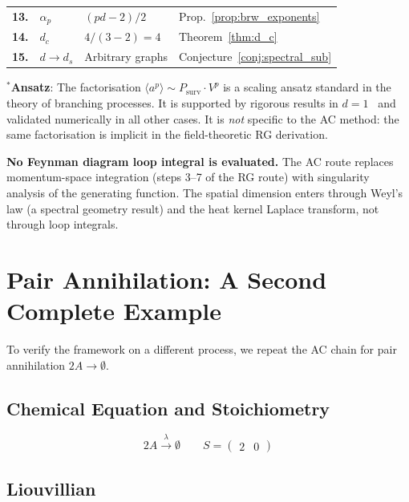 \documentclass[11pt,a4paper]{article}
\theoremstyle{definition}
\newcommand{\Psurv}{P_{\mathrm{surv}}}
\begin{document}
\begin{tcolorbox}[
  colback=blue!3, colframe=deepblue, arc=4pt,
  title={\textbf{Complete AC Route: Chemical Equation $\to$ Critical Exponents}},
  fonttitle=\bfseries\color{white},
  coltitle=white,
  breakable
]
\begin{tabular}{@{}rlp{5.5cm}l@{}}
\textbf{13.} & $\alpha_p$ &
$\boxed{(pd - 2)/2}$
& Prop.~\ref{prop:brw_exponents} \\

\textbf{14.} & $d_c$ &
$4/(3-2) = 4$
& Theorem~\ref{thm:d_c} \\

\textbf{15.} & $d \to d_s$ &
Arbitrary graphs
& Conjecture~\ref{conj:spectral_sub} \\
\end{tabular}

\medskip
\small
$^*$\textbf{Ansatz}: The factorisation $\langle a^p \rangle \sim \Psurv \cdot V^p$
is a scaling ansatz standard in the theory of branching processes. It is
supported by rigorous results in $d = 1$~\cite{legall1999} and validated
numerically in all other cases. It is \emph{not} specific to the AC method:
the same factorisation is implicit in the field-theoretic RG derivation.

\medskip
\textbf{No Feynman diagram loop integral is evaluated.} The AC route replaces
momentum-space integration (steps 3--7 of the RG route) with singularity
analysis of the generating function. The spatial dimension enters through
Weyl's law (a spectral geometry result) and the heat kernel Laplace
transform, not through loop integrals.
\end{tcolorbox}

\section{Pair Annihilation: A Second Complete Example}
\label{sec:pair}

To verify the framework on a different process, we repeat the AC chain
for pair annihilation $2A \to \emptyset$.

\subsection{Chemical Equation and Stoichiometry}

\begin{equation}
2A \xrightarrow{\;\lambda\;} \emptyset
\qquad
S = \begin{pmatrix} 2 & 0 \end{pmatrix}
\end{equation}

\subsection{Liouvillian}
\end{document}
